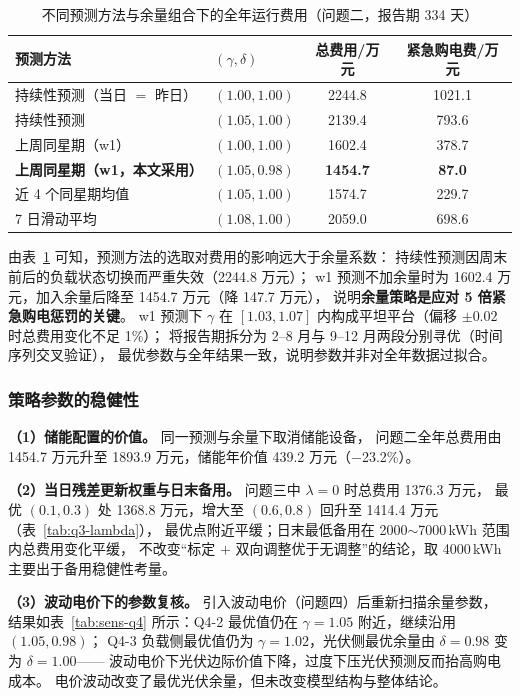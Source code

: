 \begin{table}[!htbp]
\caption{不同预测方法与余量组合下的全年运行费用（问题二，报告期 334 天）}\label{tab:sens-q2}
\centering
\small
\setlength{\tabcolsep}{5pt}
\begin{tabular}{llcc}
\toprule
预测方法 & $(\gamma,\delta)$ & 总费用/万元 & 紧急购电费/万元 \\
\midrule
持续性预测（当日 $=$ 昨日） & $(1.00,1.00)$ & 2244.8 & 1021.1 \\
持续性预测 & $(1.05,1.00)$ & 2139.4 & 793.6 \\
上周同星期（w1） & $(1.00,1.00)$ & 1602.4 & 378.7 \\
\textbf{上周同星期（w1，本文采用）} & $\bm{(1.05,0.98)}$ & \textbf{1454.7} & \textbf{87.0} \\
近 4 个同星期均值 & $(1.05,1.00)$ & 1574.7 & 229.7 \\
7 日滑动平均 & $(1.08,1.00)$ & 2059.0 & 698.6 \\
\bottomrule
\end{tabular}
\end{table}

由表~\ref{tab:sens-q2} 可知，预测方法的选取对费用的影响远大于余量系数：
持续性预测因周末前后的负载状态切换而严重失效（2244.8 万元）；
w1 预测不加余量时为 1602.4 万元，加入余量后降至 1454.7 万元（降 147.7 万元），
说明\textbf{余量策略是应对 5 倍紧急购电惩罚的关键}。
w1 预测下 $\gamma$ 在 $[1.03,1.07]$ 内构成平坦平台（偏移 $\pm0.02$ 时总费用变化不足 1\%）；
将报告期拆分为 2--8 月与 9--12 月两段分别寻优（时间序列交叉验证\cite{fpp3}），
最优参数与全年结果一致，说明参数并非对全年数据过拟合。

\subsubsection{策略参数的稳健性}
\textbf{（1）储能配置的价值。} 同一预测与余量下取消储能设备，
问题二全年总费用由 1454.7 万元升至 1893.9 万元，储能年价值 439.2 万元（$-$23.2\%）。

\textbf{（2）当日残差更新权重与日末备用。} 问题三中 $\lambda=0$ 时总费用 1376.3 万元，
最优 $(0.1,0.3)$ 处 1368.8 万元，增大至 $(0.6,0.8)$ 回升至 1414.4 万元（表~\ref{tab:q3-lambda}），
最优点附近平缓；日末最低备用在 2000$\sim$7000\,kWh 范围内总费用变化平缓，
不改变“标定 $+$ 双向调整优于无调整”的结论，取 4000\,kWh 主要出于备用稳健性考量。

\textbf{（3）波动电价下的参数复核。} 引入波动电价（问题四）后重新扫描余量参数，
结果如表~\ref{tab:sens-q4} 所示：Q4-2 最优值仍在 $\gamma=1.05$ 附近，继续沿用 $(1.05,0.98)$；
Q4-3 负载侧最优值仍为 $\gamma=1.02$，光伏侧最优余量由 $\delta=0.98$ 变为 $\delta=1.00$——
波动电价下光伏边际价值下降，过度下压光伏预测反而抬高购电成本。
电价波动改变了最优光伏余量，但未改变模型结构与整体结论。

